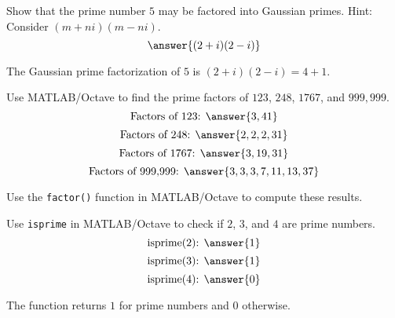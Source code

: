 \documentclass{ximera}
\author{Jont Allen}
\begin{document}
\begin{problem}
    Show that the prime number \(5\) may be factored into Gaussian primes. Hint: Consider \((m + ni)(m - ni)\).
    \[
    \answer{(2 + i)(2 - i)}
    \]
    \begin{feedback}[correct]
    The Gaussian prime factorization of \(5\) is \((2 + i)(2 - i) = 4 + 1\).
    \end{feedback}
\end{problem}

\begin{problem}
    Use MATLAB/Octave to find the prime factors of \(123\), \(248\), \(1767\), and \(999,999\).
    \[
    \text{Factors of 123: } \answer{3, 41}
    \]
    \[
    \text{Factors of 248: } \answer{2, 2, 2, 31}
    \]
    \[
    \text{Factors of 1767: } \answer{3, 19, 31}
    \]
    \[
    \text{Factors of 999,999: } \answer{3, 3, 3, 7, 11, 13, 37}
    \]
    \begin{feedback}[correct]
    Use the \texttt{factor()} function in MATLAB/Octave to compute these results.
    \end{feedback}
\end{problem}

\begin{problem}
    Use \texttt{isprime} in MATLAB/Octave to check if \(2\), \(3\), and \(4\) are prime numbers.
    \[
    \text{isprime(2): } \answer{1}
    \]
    \[
    \text{isprime(3): } \answer{1}
    \]
    \[
    \text{isprime(4): } \answer{0}
    \]
    \begin{feedback}[correct]
    The function returns \(1\) for prime numbers and \(0\) otherwise.
    \end{feedback}
\end{problem}
\end{document}
